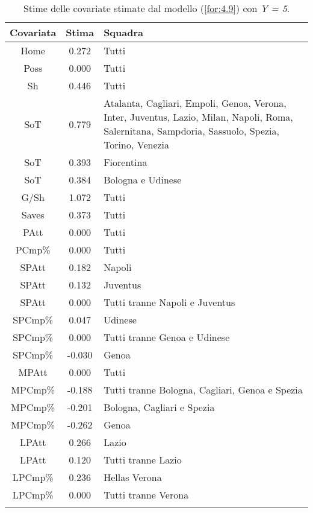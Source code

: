 \begin{table}[!htbp]
	
	\renewcommand{\arraystretch}{1.7}
	\centering
	\begin{tabular}{ccp{10cm}}
		\hline	
		\rowcolor{SchoolColor2}
		\textbf{Covariata} & \textbf{Stima} & \textbf{Squadra} \\	
		\hline
		Home & 0.272 & Tutti\\
		Poss & 0.000 & Tutti\\
		Sh & 0.446 & Tutti \\
		SoT & 0.779 & Atalanta, Cagliari, Empoli, Genoa, Verona, Inter, Juventus, Lazio, Milan, Napoli, Roma, Salernitana, Sampdoria, Sassuolo, Spezia, Torino, Venezia\\
		SoT & 0.393 & Fiorentina\\
		SoT & 0.384 & Bologna e Udinese \\
		G/Sh & 1.072 & Tutti \\
		Saves & 0.373 & Tutti \\
		PAtt & 0.000 & Tutti \\
		PCmp\% & 0.000 & Tutti \\
		SPAtt & 0.182 & Napoli \\
		SPAtt & 0.132 & Juventus \\
		SPAtt & 0.000 & Tutti tranne Napoli e Juventus \\
		SPCmp\% & 0.047 & Udinese \\	
		SPCmp\% & 0.000 & Tutti tranne Genoa e Udinese\\ 
		SPCmp\% & -0.030 & Genoa \\	
		MPAtt & 0.000 & Tutti \\ 
		MPCmp\% & -0.188 & Tutti tranne Bologna, Cagliari, Genoa e Spezia \\
		MPCmp\% & -0.201 & Bologna, Cagliari e Spezia \\
		MPCmp\% & -0.262 & Genoa \\
		LPAtt & 0.266 & Lazio \\
		LPAtt & 0.120 & Tutti tranne Lazio \\
		LPCmp\% & 0.236 & Hellas Verona \\
		LPCmp\% & 0.000 & Tutti tranne  Verona \\
		
		\hline
		& &  \\
		
	\end{tabular} \hbox{}
	\caption{Stime delle covariate stimate dal modello (\ref{for:4.9}) con \emph{Y = 5}.} \label{tab:BTCL25} 
	
\end{table}
